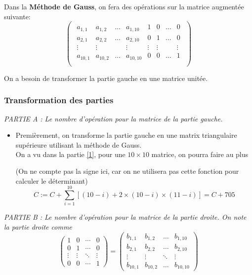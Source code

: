 \documentclass{article}
\begin{document}
Dans la \textbf{Méthode de Gauss}, on fera des opérations sur la matrice augmentée suivante:\\

\[
    \begin{pmatrix}  
\begin{array}{cccc|cccc}
a_{1,1} & a_{1,2} & ... & a_{1,10} & 1 &0&... &0\\
a_{2,1} & a_{2,2} & ... & a_{2,10} & 0 &1 & ...&0\\
\vdots & \vdots & & \vdots & \vdots &\vdots & &\vdots\\
a_{10,1} & a_{10,2} & ... & a_{10,10} & 0& 0&... & 1\\
\end{array}\end{pmatrix} 
\]

On a besoin de transformer la partie gauche en une matrice unitée.

\subsubsection{Transformation des parties}\label{2}
\begin{tcolorbox}
    \textit{ PARTIE A : Le nombre d'opération pour la matrice de la partie gauche.}\label{2A}
\end{tcolorbox}
\begin{itemize}
    \item Premièrement, on transforme la partie gauche en une matrix triangulaire supérieure utilisant la méthode de Gauss.\\ On a vu dans la partie \ref{1}, pour une $10 \times 10$ matrice, on pourra faire au plus 

        \begin{tcolorbox}
            (On ne compte pas la signe ici, car on ne utilisera pas cette fonction pour calculer le déterminant)
        \[
            C := C + \sum_{i=1}^{10} [(10-i) + 2 \times  (10-i) \times (11-i)]   = C + 705
        \]
        \end{tcolorbox}
        
       \end{itemize}

\begin{tcolorbox}
    \textit{PARTIE B : Le nombre d'opération pour la matrice de la partie droite. On note la partie droite comme} \label{2B}
\[
\begin{pmatrix}
    1 & 0 & \cdots & 0 \\
    0 & 1 & \cdots & 0 \\
    \vdots & \vdots & \ddots & \vdots \\
    0 & 0 & \cdots & 1
\end{pmatrix} = 
\begin{pmatrix}
    b_{1,1} & b_{1,2} & \ldots & b_{1, 10} \\
    b_{2,1} & b_{2,2} & \ldots & b_{2, 10} \\
    \vdots & \vdots & \ddots & \vdots \\
    b_{10,1} & b_{10,2} & \ldots & b_{10, 10}
\end{pmatrix}
\]

\end{tcolorbox}
\end{document}
